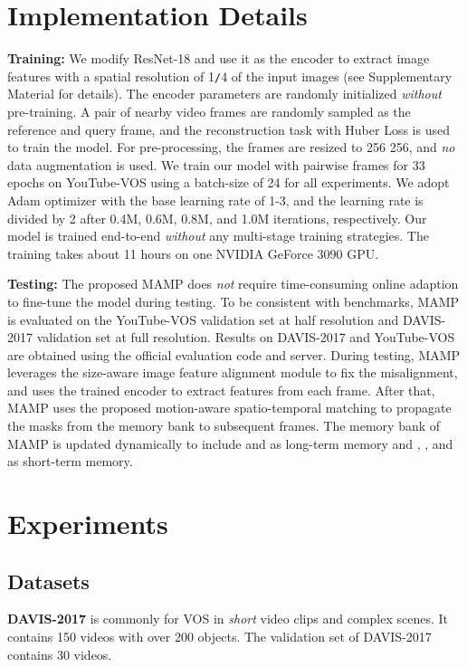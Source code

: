 \documentclass[letterpaper]{article} \usepackage{aaai22}  \usepackage{times}  \usepackage{helvet}  \usepackage{courier}  \usepackage[hyphens]{url}  \usepackage{graphicx} \urlstyle{rm} \def\UrlFont{\rm}  \usepackage{natbib}  \usepackage{caption} \DeclareCaptionStyle{ruled}{labelfont=normalfont,labelsep=colon,strut=off} \frenchspacing  \setlength{\pdfpagewidth}{8.5in}  \setlength{\pdfpageheight}{11in}  \usepackage{algorithm}
\begin{document}
\section{Implementation Details}

\textbf{Training:} We modify ResNet-18 and use it as the encoder to extract image features with a spatial resolution of 1\verb|/|4 of the input images (see Supplementary Material for details). The encoder parameters are randomly initialized \emph{without} pre-training. A pair of nearby video frames are randomly sampled as the reference and query frame, and the reconstruction task with Huber Loss is used to train the model. For pre-processing, the frames are resized to 256  256, and \emph{no} data augmentation is used. We train our model with pairwise frames for 33 epochs on YouTube-VOS using a batch-size of 24 for all experiments. We adopt Adam optimizer with the base learning rate of 1-3, and the learning rate is divided by 2 after 0.4M, 0.6M, 0.8M, and 1.0M iterations, respectively. Our model is trained end-to-end \emph{without} any multi-stage training strategies. The training takes about 11 hours on one NVIDIA GeForce 3090 GPU.


\noindent\textbf{Testing:} The proposed MAMP does \emph{not} require time-consuming online adaption to fine-tune the model during testing. To be consistent with benchmarks, MAMP is evaluated on the YouTube-VOS validation set at half resolution and DAVIS-2017 validation set at full resolution. Results on DAVIS-2017 and YouTube-VOS are obtained using the official evaluation code and server. During testing, MAMP leverages the size-aware image feature alignment module to fix the misalignment, and uses the trained encoder to extract features from each frame. After that, MAMP uses the proposed motion-aware spatio-temporal matching to propagate the masks from the memory bank to subsequent frames. The memory bank of MAMP is updated dynamically to include  and  as long-term memory and , , and  as short-term memory.

\section{Experiments}
\subsection{Datasets}
\noindent\textbf{DAVIS-2017} \cite{davis2017} is commonly for VOS in \emph{short} video clips and complex scenes. It contains 150 videos with over 200 objects. The validation set of DAVIS-2017 contains 30 videos.
\end{document}

